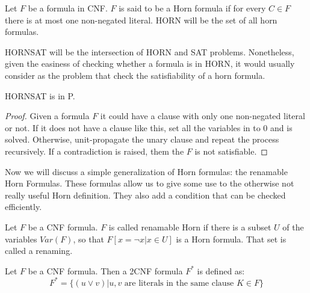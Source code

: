\begin{definition}
  Let $F$ be a formula in CNF. $F$ is said to be a Horn formula if for every $C \in F$ there is at most one non-negated literal. HORN will be the set of all horn formulas.
\end{definition}




\begin{definition}
  HORNSAT will be the intersection of HORN and SAT problems. Nonetheless, given the easiness of checking whether a formula is in HORN, it would usually consider as the problem that check the satisfiability of a horn formula.
\end{definition}


\begin{proposition}
  HORNSAT is in P.
\end{proposition}
\begin{proof}
  Given a formula $F$ it could have a clause with only one non-negated literal or not. If it does not have a clause like this, set all the variables in to 0 and is solved. Otherwise, unit-propagate the unary clause and repeat the process recursively. If a contradiction is raised, them the $F$ is not satisfiable.
\end{proof}


Now we will discuss a simple generalization of Horn formulas: the renamable Horn Formulas. These formulas allow us to give some use to the otherwise not really useful Horn definition. They also add a condition that can be checked efficiently.

\begin{definition}
  Let $F$ be a CNF formula. $F$ is called renamable Horn if there is a subset $U$ of the variables $Var(F)$, so that $F[x=\neg x | x \in U]$ is a Horn formula.
  That set is called a renaming.
\end{definition}


\begin{definition}
  Let $F$ be a CNF formula. Then a 2CNF formula $F^*$ is defined as:
  $$F^* = \{(u \vee v) | u,v \text{ are literals in the same clause } K \in F \}$$
\end{definition}


